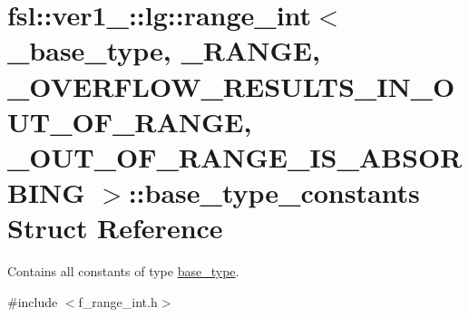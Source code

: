 \hypertarget{structfsl_1_1ver1__0_1_1lg_1_1range__int_1_1base__type__constants}{}\section{fsl\+::ver1\+\_\+::lg\+::range\+\_\+int$<$ \+\_\+base\+\_\+type, \+\_\+\+R\+A\+N\+GE, \+\_\+\+O\+V\+E\+R\+F\+L\+O\+W\+\_\+\+R\+E\+S\+U\+L\+T\+S\+\_\+\+I\+N\+\_\+\+O\+U\+T\+\_\+\+O\+F\+\_\+\+R\+A\+N\+GE, \+\_\+\+O\+U\+T\+\_\+\+O\+F\+\_\+\+R\+A\+N\+G\+E\+\_\+\+I\+S\+\_\+\+A\+B\+S\+O\+R\+B\+I\+NG $>$\+::base\+\_\+type\+\_\+constants Struct Reference}
\label{structfsl_1_1ver1__0_1_1lg_1_1range__int_1_1base__type__constants}


Contains all constants of type \mbox{\hyperlink{classfsl_1_1ver1__0_1_1lg_1_1range__int_af14c814b65a761cd387e7577eb2ef78c}{base\+\_\+type}}.  




{\ttfamily \#include $<$f\+\_\+range\+\_\+int.\+h$>$}

